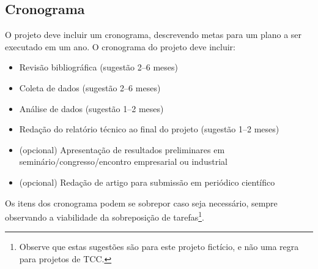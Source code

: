 \documentclass[a4paper]{article}
\begin{document}
\subsection{Cronograma}

O projeto deve incluir um cronograma, descrevendo metas para um plano
a ser executado em um ano.
O cronograma do projeto deve incluir:

\begin{itemize}
\item Revisão bibliográfica (sugestão 2--6 meses)
\item Coleta de dados (sugestão 2--6 meses)
\item Análise de dados (sugestão 1--2 meses)
\item Redação do relatório técnico ao final do projeto (sugestão 1--2 meses)
\item (opcional) Apresentação de resultados preliminares em seminário/congresso/encontro empresarial ou industrial
\item (opcional) Redação de artigo para submissão em periódico científico
\end{itemize}

Os itens dos cronograma podem se sobrepor caso seja necessário, sempre
observando a viabilidade da sobreposição de tarefas\footnote{Observe
  que estas sugestões são para este projeto fictício, e não uma regra
  para projetos de TCC.}.
\end{document}
